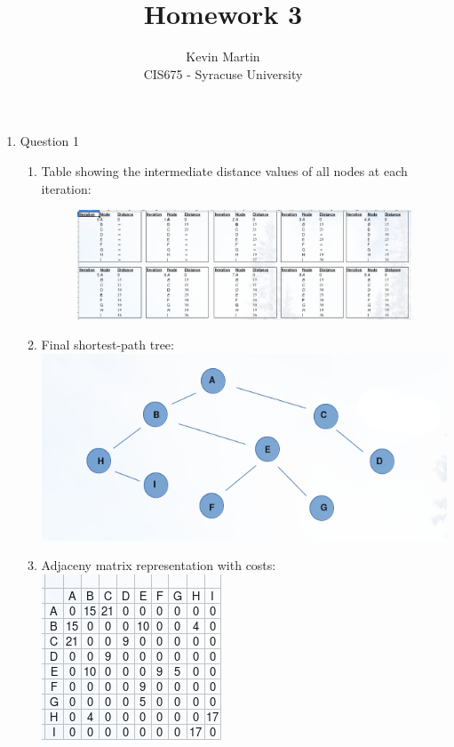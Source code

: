 \documentclass{article}
\author{Kevin Martin\\ CIS675 - Syracuse University}
\title{Homework 3}
\begin{document}
\maketitle
\begin{enumerate}
  \item Question 1
    \begin{enumerate}
        \item Table showing the intermediate distance values of all nodes at each iteration:\\
          \begin{figure}[h]
            \centering
          \includegraphics[scale=.4]{inttable3.png}
          \end{figure}


        \item Final shortest-path tree:\\
        \includegraphics[scale=.7]{shorttree3.png}

        \item Adjaceny matrix representation with costs:\\
        \includegraphics[scale=.75]{adjmatrix3.png}


\end{enumerate}
\end{enumerate}
\end{document}
